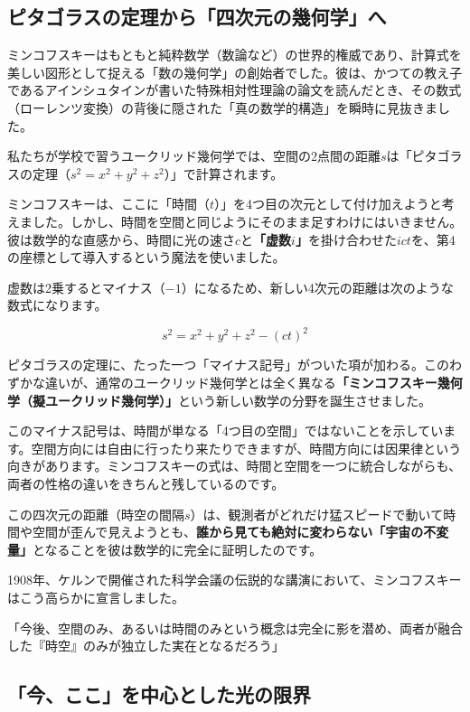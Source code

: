 \subsection{ピタゴラスの定理から「四次元の幾何学」へ}

ミンコフスキーはもともと純粋数学（数論など）の世界的権威であり、計算式を美しい図形として捉える「数の幾何学」の創始者でした。彼は、かつての教え子であるアインシュタインが書いた特殊相対性理論の論文を読んだとき、その数式（ローレンツ変換）の背後に隠された「真の数学的構造」を瞬時に見抜きました。

私たちが学校で習うユークリッド幾何学では、空間の2点間の距離\(s\)は「ピタゴラスの定理（\(s^2=x^2+y^2+z^2\)）」で計算されます。

ミンコフスキーは、ここに「時間（\(t\)）」を4つ目の次元として付け加えようと考えました。しかし、時間を空間と同じようにそのまま足すわけにはいきません。彼は数学的な直感から、時間に光の速さ\(c\)と\textbf{「虚数\(i\)」}を掛け合わせた\(ict\)を、第4の座標として導入するという魔法を使いました。

虚数は2乗するとマイナス（\(-1\)）になるため、新しい4次元の距離は次のような数式になります。

\[
s^2=x^2+y^2+z^2-(ct)^2
\]

ピタゴラスの定理に、たった一つ「マイナス記号」がついた項が加わる。このわずかな違いが、通常のユークリッド幾何学とは全く異なる\textbf{「ミンコフスキー幾何学（擬ユークリッド幾何学）」}という新しい数学の分野を誕生させました。

このマイナス記号は、時間が単なる「4つ目の空間」ではないことを示しています。空間方向には自由に行ったり来たりできますが、時間方向には因果律という向きがあります。ミンコフスキーの式は、時間と空間を一つに統合しながらも、両者の性格の違いをきちんと残しているのです。

この四次元の距離（時空の間隔\(s\)）は、観測者がどれだけ猛スピードで動いて時間や空間が歪んで見えようとも、\textbf{誰から見ても絶対に変わらない「宇宙の不変量」}となることを彼は数学的に完全に証明したのです。

1908年、ケルンで開催された科学会議の伝説的な講演において、ミンコフスキーはこう高らかに宣言しました。

「今後、空間のみ、あるいは時間のみという概念は完全に影を潜め、両者が融合した『時空』のみが独立した実在となるだろう」

\subsection{「今、ここ」を中心とした光の限界}

